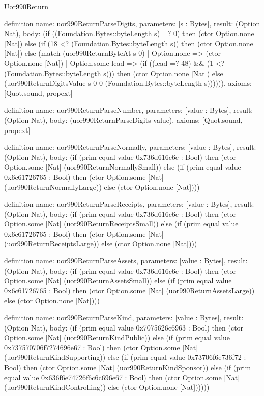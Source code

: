 \begin{lexlean}{Uor990Return}
\begin{semanticmodule}
definition{
  name: uor990ReturnParseDigits,
  parameters: [s : Bytes],
  result: (Option Nat),
  body: (if ((Foundation.Bytes::byteLength s) =? 0) then (ctor Option.none [Nat]) else (if (18 <? (Foundation.Bytes::byteLength s)) then (ctor Option.none [Nat]) else (match (uor990ReturnByteAt s 0)
    | Option.none => (ctor Option.none [Nat])
    | Option.some lead => (if ((lead =? 48) && (1 <? (Foundation.Bytes::byteLength s))) then (ctor Option.none [Nat]) else (uor990ReturnDigitsValue s 0 0 (Foundation.Bytes::byteLength s)))))),
  axioms: [Quot.sound, propext]
}

definition{
  name: uor990ReturnParseNumber,
  parameters: [value : Bytes],
  result: (Option Nat),
  body: (uor990ReturnParseDigits value),
  axioms: [Quot.sound, propext]
}

definition{
  name: uor990ReturnParseNormally,
  parameters: [value : Bytes],
  result: (Option Nat),
  body: (if (prim equal value 0x736d616c6c : Bool) then (ctor Option.some [Nat] (uor990ReturnNormallySmall)) else (if (prim equal value 0x6c61726765 : Bool) then (ctor Option.some [Nat] (uor990ReturnNormallyLarge)) else (ctor Option.none [Nat])))
}

definition{
  name: uor990ReturnParseReceipts,
  parameters: [value : Bytes],
  result: (Option Nat),
  body: (if (prim equal value 0x736d616c6c : Bool) then (ctor Option.some [Nat] (uor990ReturnReceiptsSmall)) else (if (prim equal value 0x6c61726765 : Bool) then (ctor Option.some [Nat] (uor990ReturnReceiptsLarge)) else (ctor Option.none [Nat])))
}

definition{
  name: uor990ReturnParseAssets,
  parameters: [value : Bytes],
  result: (Option Nat),
  body: (if (prim equal value 0x736d616c6c : Bool) then (ctor Option.some [Nat] (uor990ReturnAssetsSmall)) else (if (prim equal value 0x6c61726765 : Bool) then (ctor Option.some [Nat] (uor990ReturnAssetsLarge)) else (ctor Option.none [Nat])))
}

definition{
  name: uor990ReturnParseKind,
  parameters: [value : Bytes],
  result: (Option Nat),
  body: (if (prim equal value 0x7075626c6963 : Bool) then (ctor Option.some [Nat] (uor990ReturnKindPublic)) else (if (prim equal value 0x737570706f7274696e67 : Bool) then (ctor Option.some [Nat] (uor990ReturnKindSupporting)) else (if (prim equal value 0x73706f6e736f72 : Bool) then (ctor Option.some [Nat] (uor990ReturnKindSponsor)) else (if (prim equal value 0x636f6e74726f6c6c696e67 : Bool) then (ctor Option.some [Nat] (uor990ReturnKindControlling)) else (ctor Option.none [Nat])))))
}


\end{semanticmodule}
\end{lexlean}
